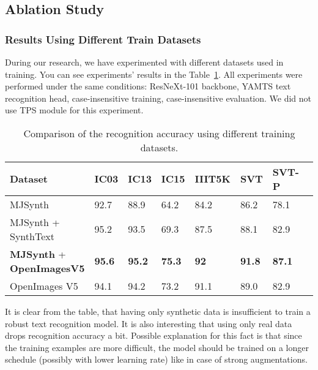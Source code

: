 \documentclass[runningheads]{llncs}
\begin{document}
\subsection{Ablation Study}
\subsubsection{Results Using Different Train Datasets}

During our research, we have experimented with different datasets used in training. You can see
experiments' results in the Table~\ref{table:dataset_comparison}. All experiments were performed
under the same conditions: ResNeXt-101 backbone, YAMTS text recognition head, case-insensitive
training, case-insensitive evaluation. We did not use TPS module for this experiment.
\begin{table}[ht]
  \centering
  \caption{Comparison of the recognition accuracy using different training datasets.}
  \begin{tabular}{|l|l|l|l|l|l|l|l|}
    \hline
    Dataset                                  & IC03          & IC13          & IC15          & IIIT5K      & SVT           & SVT-P         \\
    \hline
    MJSynth                                  & 92.7          & 88.9          & 64.2          & 84.2        & 86.2          & 78.1          \\
    MJSynth + SynthText                      & 95.2          & 93.5          & 69.3          & 87.5        & 88.1          & 82.9          \\
    \textbf{MJSynth} + \textbf{OpenImagesV5} & \textbf{95.6} & \textbf{95.2} & \textbf{75.3} & \textbf{92} & \textbf{91.8} & \textbf{87.1} \\
    OpenImages V5                            & 94.1          & 94.2          & 73.2          & 91.1        & 89.0          & 82.9          \\
    \hline
  \end{tabular}

  \label{table:dataset_comparison}
\end{table}

It is clear from the table, that having only synthetic data is insufficient to train a
robust text recognition model. It is also interesting that using only real data drops
recognition accuracy a bit. Possible explanation for this fact is that since the training
examples are more difficult, the model should be trained on a longer schedule
(possibly with lower learning rate) like in case of strong augmentations.
\end{document}
